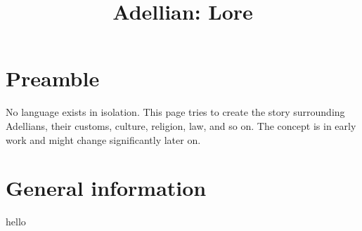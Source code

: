 \documentclass[12pt]{article}
\begin{document}
	\title{Adellian: Lore}
	\maketitle
	
	\section{Preamble}
	
	No language exists in isolation. This page tries to create the story surrounding Adellians, their customs, culture, religion, law, and so on. The concept is in early work and might change significantly later on.
	
	\tableofcontents
	
	\section{General information}
	
	hello	
	
\end{document}
